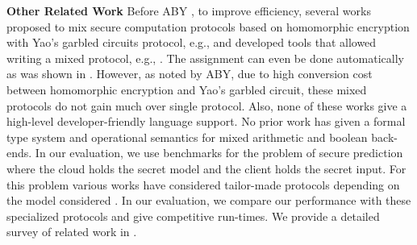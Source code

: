%
%
%
%
%
%
%
%
%
%




\vspace{10pt}

\noindent\textbf{Other Related Work} 
Before ABY \cite{aby}, to improve efficiency, several works proposed
to mix secure computation protocols based on homomorphic
encryption with Yao’s garbled circuits protocol, e.g., \cite{barni,blanton,brickell,franz,huang,valeriaMatrix,valeriaRidge,schropferK11}
  and developed tools that allowed writing a mixed \mpc protocol, e.g., \cite{bogdanov,lone,tasty}. The assignment can
even be done automatically as was shown in \cite{autoS}. 
However, as noted by ABY, due to high conversion cost between homomorphic encryption and Yao's garbled circuit, these mixed protocols do not gain much over single protocol. Also, none of these works give a high-level developer-friendly language support.
No prior work has given a formal type system and operational semantics for mixed arithmetic and boolean back-ends.
In our evaluation, we use benchmarks for the problem of secure prediction where the cloud holds the secret model and the client holds the secret input. For this problem various works have considered tailor-made protocols depending on the model considered \cite{shafindss,wu,secureml,minionn}. In our evaluation, we compare our performance with these specialized protocols and give competitive run-times. We provide a detailed survey of related work in .
